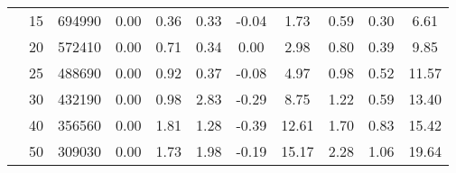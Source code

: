 {\begin{longtable}{@{}lclcccccccc@{}}
                      & 15 & 694990          & 0.00    & 0.36  & 0.33  & -0.04 & 1.73    & 0.59 & 0.30 & 6.61  \\
                      & 20 & 572410          & 0.00    & 0.71  & 0.34  & 0.00  & 2.98    & 0.80 & 0.39 & 9.85  \\
                      & 25 & 488690          & 0.00    & 0.92  & 0.37  & -0.08 & 4.97    & 0.98 & 0.52 & 11.57 \\
                      & 30 & 432190          & 0.00    & 0.98  & 2.83  & -0.29 & 8.75    & 1.22 & 0.59 & 13.40 \\
                      & 40 & 356560          & 0.00    & 1.81  & 1.28  & -0.39 & 12.61   & 1.70 & 0.83 & 15.42 \\
                      & 50 & 309030          & 0.00    & 1.73  & 1.98  & -0.19 & 15.17   & 2.28 & 1.06 & 19.64 \\ \bottomrule
\end{longtable}}
\label{results-all-1}